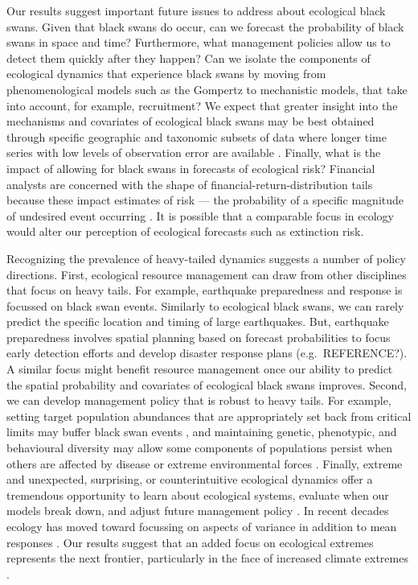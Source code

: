 Our results suggest important future issues to address about ecological black
swans. Given that black swans do occur, can we forecast the probability of
black swans in space and time? Furthermore, what management policies allow us
to detect them quickly after they happen? Can we isolate the components of
ecological dynamics that experience black swans by moving from phenomenological
models such as the Gompertz to mechanistic models, that take into account, for
example, recruitment? We expect that greater insight into the mechanisms and
covariates of ecological black swans may be best obtained through specific
geographic and taxonomic subsets of data where longer time series with low
levels of observation error are available \citep[e.g.][]{segura2013}. Finally,
what is the impact of allowing for black swans in forecasts of ecological risk?
Financial analysts are concerned with the shape of
financial-return-distribution tails because these impact estimates of risk ---
the probability of a specific magnitude of undesired event occurring
\citep{rachev2008}. It is possible that a comparable focus in ecology would
alter our perception of ecological forecasts such as extinction risk.

Recognizing the prevalence of heavy-tailed dynamics suggests a number of policy
directions. First, ecological resource management can draw from other
disciplines that focus on heavy tails. For example, earthquake preparedness and
response is focussed on black swan events. Similarly to ecological black swans,
we can rarely predict the specific location and timing of large earthquakes.
But, earthquake preparedness involves spatial planning based on forecast
probabilities to focus early detection efforts and develop disaster response
plans (e.g.~REFERENCE?). A similar focus might benefit resource management once
our ability to predict the spatial probability and covariates of ecological
black swans improves. Second, we can develop management policy that is robust
to heavy tails. For example, setting target population abundances that are
appropriately set back from critical limits may buffer black swan events
\citep[e.g.][]{caddy1996}, and maintaining genetic, phenotypic, and behavioural
diversity may allow some components of populations persist when others are
affected by disease or extreme environmental forces
\citep[e.g.][]{schindler2010, anderson2014}. Finally, extreme and unexpected,
surprising, or counterintuitive ecological dynamics offer a tremendous
opportunity to learn about ecological systems, evaluate when our models break
down, and adjust future management policy \citep{doak2008, pine-iii2009,
  lindenmayer2010}. In recent decades ecology has moved toward focussing on
aspects of variance in addition to mean responses \citep[e.g.][]{loreau2010a,
  thompson2013}. Our results suggest that an added focus on ecological extremes
represents the next frontier, particularly in the face of increased climate
extremes \citep{meehl2004,ipcc2012}.

